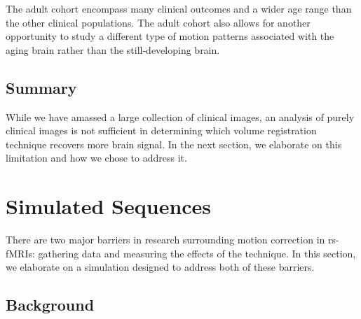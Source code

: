 

The adult cohort encompass many clinical outcomes and a wider age range than the other clinical populations. The adult cohort also allows for another opportunity to study a different type of motion patterns associated with the aging brain rather than the still-developing brain.

\subsection{Summary}

While we have amassed a large collection of clinical images, an analysis of purely clinical images is not sufficient in determining which volume registration technique recovers more brain signal. In the next section, we elaborate on this limitation and how we chose to address it.

\section{Simulated Sequences} %

There are two major barriers in research surrounding motion correction in rs-fMRIs: gathering data and measuring the effects of the technique. In this section, we elaborate on a simulation designed to address both of these barriers.

\subsection{Background}

